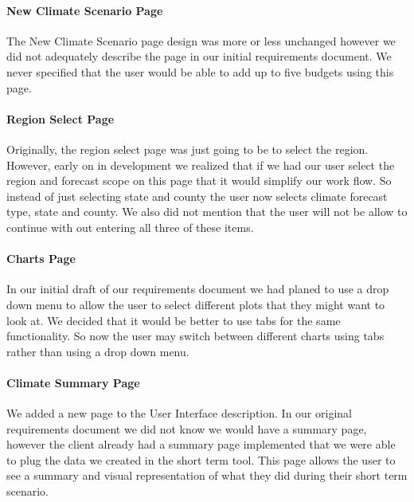\documentclass[onecolumn, draftclsnofoot,10pt, compsoc]{article}
\begin{document}
	        \paragraph{New Climate Scenario Page}
	        The New Climate Scenario page design was more or less unchanged however we did not adequately describe the page in our initial requirements document. We never specified that the user would be able to add up to five budgets using this page.\\

	        \paragraph{Region Select Page}
	        Originally, the region select page was just going to be to select the region. However, early on in development we realized that if we had our user select the region and forecast scope on this page that it would simplify our work flow. So instead of just selecting state and county the user now selects climate forecast type, state and county. We also did not mention that the user will not be allow to continue with out entering all three of these items.\\
	        
	        \paragraph{Charts Page}
	        In our initial draft of our requirements document we had planed to use a drop down menu to allow the user to select different plots that they might want to look at. We decided that it would be better to use tabs for the same functionality. So now the user may switch between different charts using tabs rather than using a drop down menu.\\
	    
	        \paragraph{Climate Summary Page}
	        We added a new page to the User Interface description. In our original requirements document we did not know we would have a summary page, however the client already had a summary page implemented that we were able to plug the data we created in the short term tool. This page allows the user to see a summary and visual representation of what they did during their short term scenario.\\
        
\end{document}

